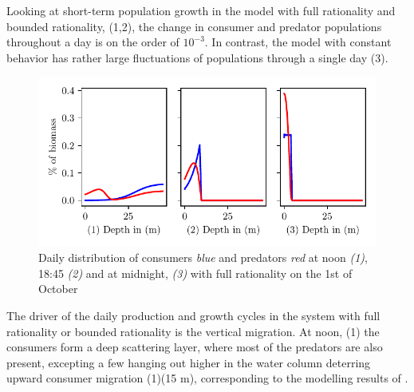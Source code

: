 Looking at short-term population growth in the model with full rationality and bounded rationality, (1,2), the change in consumer and predator populations throughout a day is on the order of $10^{-3}$. In contrast, the model with constant behavior has rather large fluctuations of populations through a single day (3).
\begin{figure}[H]
\includegraphics{plots/specific_dists_rational.pdf}
\caption{Daily distribution of consumers \emph{blue} and predators \emph{red} at noon \emph{(1)}, 18:45 \emph{(2)} and at midnight, \emph{(3)} with full rationality on the 1st of October}
\label{fig:specific_dists_rational}
\end{figure}
The driver of the daily production and growth cycles in the system with full rationality or bounded rationality is the vertical migration. At noon, (1) the consumers form a deep scattering layer, where most of the predators are also present, excepting a few hanging out higher in the water column deterring upward consumer migration (1)(15 m), corresponding to the modelling results of \citep{jerome}.

